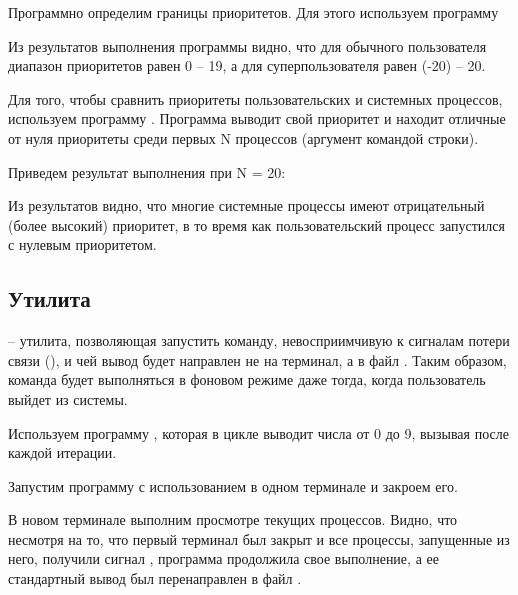 Программно определим границы приоритетов. Для этого используем программу 



Из результатов выполнения программы видно, что для обычного пользователя диапазон приоритетов равен 0 -- 19, а для суперпользователя равен (-20) -- 20.


Для того, чтобы сравнить приоритеты пользовательских и системных процессов, используем программу . Программа выводит свой приоритет и находит отличные от нуля приоритеты среди первых N процессов (аргумент командой строки).



Приведем результат выполнения при N = 20:


Из результатов видно, что многие системные процессы имеют отрицательный (более высокий) приоритет, в то время как пользовательский процесс запустился с нулевым приоритетом.

\subsection{Утилита }

 -- утилита, позволяющая запустить команду, невосприимчивую к сигналам потери связи (), и чей вывод будет направлен не на терминал, а в файл . Таким образом, команда будет выполняться в фоновом режиме даже тогда, когда пользователь выйдет из системы. 

Используем программу , которая в цикле выводит числа от 0 до 9, вызывая  после каждой итерации. 



Запустим программу с использованием  в одном терминале и закроем его.



В новом терминале выполним просмотре текущих процессов. Видно, что несмотря на то, что первый терминал был закрыт и все процессы, запущенные из него, получили сигнал , программа  продолжила свое выполнение, а ее стандартный вывод был перенаправлен в файл .



